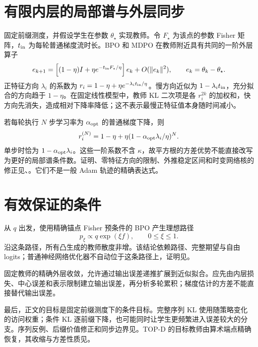\section{有限内层的局部谱与外层同步}
固定前缀测度，并假设学生在参数 $\theta_\star$ 实现教师。令 $F_\star$ 为该点的参数 Fisher 矩阵，$t_{\rm in}$ 为每轮普通梯度流时长。BPO 和 MDPO 在教师附近具有共同的一阶外层算子
\begin{equation}
e_{k+1}=\left[(1-\eta)I+\eta e^{-t_{\rm in}F_\star/\eta}\right]e_k+O(\|e_k\|^2),
\qquad e_k=\theta_k-\theta_\star.
\end{equation}
正特征方向 $\lambda_i$ 的系数为 $r_i=1-\eta+\eta e^{-\lambda_i t_{\rm in}/\eta}$。慢方向近似为 $1-\lambda_i t_{\rm in}$，充分拟合的方向趋于 $1-\eta$。在固定线性模型中，教师 KL 二次项是各 $r_i^{2k}$ 的加权和，快方向先消失，造成相对下降率降低；这不表示最慢正特征值本身随时间减小。

若每轮执行 $N$ 步学习率为 $\alpha_{\rm opt}$ 的普通梯度下降，则
\begin{equation}
r_i^{(N)}=1-\eta+\eta(1-\alpha_{\rm opt}\lambda_i/\eta)^N.
\end{equation}
单步时恰为 $1-\alpha_{\rm opt}\lambda_i$。这些一阶系数不含 $\kappa$，故平方根的方差优势不能直接改写为更好的局部谱条件数。证明、零特征方向的限制、外推稳定区间和时变网络核的修正见、。它们不是一般 Adam 轨迹的精确表达式。

\section{有效保证的条件}
从 $q$ 出发，使用精确锚点 Fisher 预条件的 BPO 产生理想路径
\begin{equation}
p_\xi\propto q\exp(\xi f),\qquad 0\le\xi\le1.
\end{equation}
沿这条路径，所有凸生成的教师散度非增。该结论依赖路径、完整期望与自由 logits；普通神经网络优化器不自动位于这条路径上，证明见。

固定教师的精确外层收敛，允许通过输出误差递推扩展到近似拟合。应先由内层损失、中心误差和表示限制建立输出误差，再分析多轮累积；梯度估计的方差不能直接替代输出误差。

最后，正文的目标是固定前缀测度下的条件目标。完整序列 KL 使用随策略变化的访问权重；条件 KL 逐前缀下降，也可能同时让学生更频繁进入误差较大的分支。序列反例、后缀价值修正和同步边界见。TOP-D 的目标教师由算术端点精确恢复，其收缩与方差性质见。
